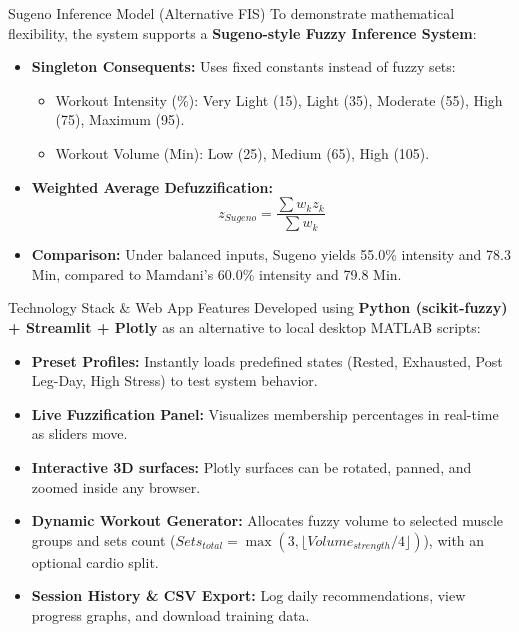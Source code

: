\documentclass[11pt]{beamer}
\begin{document}
\begin{frame}{Sugeno Inference Model (Alternative FIS)}
  To demonstrate mathematical flexibility, the system supports a \textbf{Sugeno-style Fuzzy Inference System}:
  \begin{itemize}
      \item \textbf{Singleton Consequents:} Uses fixed constants instead of fuzzy sets:
      \begin{itemize}
          \item Workout Intensity (\%): Very Light (15), Light (35), Moderate (55), High (75), Maximum (95).
          \item Workout Volume (Min): Low (25), Medium (65), High (105).
      \end{itemize}
      \item \textbf{Weighted Average Defuzzification:}
      \begin{equation*}
      z_{Sugeno} = \frac{\sum w_k z_k}{\sum w_k}
      \end{equation*}
      \item \textbf{Comparison:} Under balanced inputs, Sugeno yields 55.0\% intensity and 78.3 Min, compared to Mamdani's 60.0\% intensity and 79.8 Min.
  \end{itemize}
\end{frame}

\begin{frame}{Technology Stack \& Web App Features}
  Developed using \textbf{Python (scikit-fuzzy) + Streamlit + Plotly} as an alternative to local desktop MATLAB scripts:
  \begin{itemize}
      \item \textbf{Preset Profiles:} Instantly loads predefined states (Rested, Exhausted, Post Leg-Day, High Stress) to test system behavior.
      \item \textbf{Live Fuzzification Panel:} Visualizes membership percentages in real-time as sliders move.
      \item \textbf{Interactive 3D surfaces:} Plotly surfaces can be rotated, panned, and zoomed inside any browser.
      \item \textbf{Dynamic Workout Generator:} Allocates fuzzy volume to selected muscle groups and sets count ($Sets_{total} = \max(3, \lfloor Volume_{strength}/4 \rfloor)$), with an optional cardio split.
      \item \textbf{Session History \& CSV Export:} Log daily recommendations, view progress graphs, and download training data.
  \end{itemize}
\end{frame}
\end{document}
